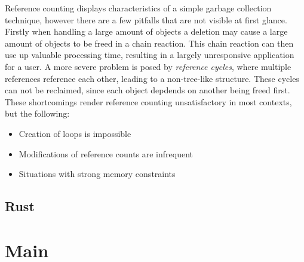 \documentclass[twocolumn]{article}
\begin{document}
Reference counting displays characteristics of a simple garbage collection technique, however there are a few pitfalls that are not visible at first glance. Firstly when handling a large amount of objects a deletion may cause a large amount of objects to be freed in a chain reaction. This chain reaction can then use up valuable processing time, resulting in a largely unresponsive application for a user. A more severe problem is posed by \textit{reference cycles}, where multiple references reference each other, leading to a non-tree-like structure. These cycles can not be reclaimed, since each object depdends on another being freed first. These shortcomings render reference counting unsatisfactory in most contexts, but the following:
\begin{itemize}
        \item Creation of loops is impossible
        \item Modifications of reference counts are infrequent
        \item Situations with strong memory constraints
\end{itemize}
\subsection{Rust}
\section{Main}
\end{document}
